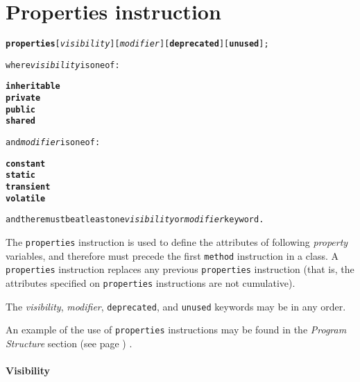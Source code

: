 \chapter{Properties instruction}\label{"id"}
\begin{shaded}
\begin{alltt}
\textbf{properties} [\emph{visibility}] [\emph{modifier}] [\textbf{deprecated}] [\textbf{unused}];

where \emph{visibility} is one of:

    \textbf{inheritable}
    \textbf{private}
    \textbf{public}
    \textbf{shared}

and \emph{modifier} is one of:

    \textbf{constant}
    \textbf{static}
    \textbf{transient}
    \textbf{volatile}

and there must be at least one \emph{visibility} or \emph{modifier} keyword.
\end{alltt}
\end{shaded}
 
The \texttt{properties} instruction is used to define the attributes
of following \emph{property} variables, and therefore must precede the
first \texttt{method} instruction in a class.
A \texttt{properties} instruction replaces any previous
\texttt{properties} instruction (that is, the attributes specified on
\texttt{properties} instructions are not cumulative).
 
The \emph{visibility}, \emph{modifier},
\texttt{deprecated}, and \texttt{unused} keywords may be in any
order.
 
An example of the use of \texttt{properties} instructions may be
found in the  \emph{Program Structure} section (see page \pageref{refpstruct}) .
\subsubsection{Visibility}
 
